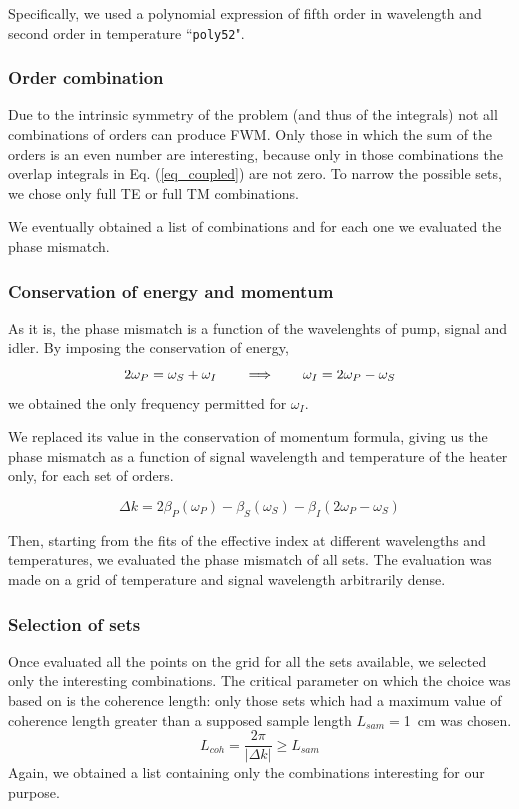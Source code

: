 \documentclass[12pt,a4paper,twoside]{article}
\begin{document}
Specifically, we used a polynomial expression of fifth order in wavelength and second order in temperature ``\texttt{poly52}".

\subsubsection{Order combination}

Due to the intrinsic symmetry of the problem (and thus of the integrals) not all combinations of orders can produce FWM.
Only those in which the sum of the orders is an even number are interesting, because only in those combinations the overlap integrals in Eq. (\ref{eq_coupled}) are not zero.
To narrow the possible sets, we chose only full TE or full TM  combinations.

We eventually obtained a list of combinations and for each one we evaluated the phase mismatch.

\subsubsection{Conservation of energy and momentum}
As it is, the phase mismatch is a function of the wavelenghts of pump, signal and idler.
By imposing the conservation of energy,
\begin{equation}
2\omega_P = \omega_S + \omega_I
\qquad \Longrightarrow \qquad
\omega_I = 2\omega_P - \omega_S \\
\end{equation}
we obtained the only frequency permitted for $\omega_I$.

We replaced its value in the conservation of momentum formula, giving us the phase mismatch as a function of signal wavelength and temperature of the heater only, for each set of orders.

\begin{equation}
	\Delta k = 2\beta_P(\omega_P)-\beta_S(\omega_S)-\beta_I(2\omega_P-\omega_S)
\end{equation}

Then, starting from the fits of the effective index at different wavelengths and temperatures, we evaluated the phase mismatch of all sets.
The evaluation was made on a grid of temperature and signal wavelength arbitrarily dense.

\subsubsection{Selection of sets}
Once evaluated all the points on the grid for all the sets available, we selected only the interesting combinations.
The critical parameter on which the choice was based on is the coherence length: only those sets which had a maximum value of coherence length greater than a supposed sample length $L_{sam} = $\SI{1}{\cm} was chosen.
\begin{equation}
	L_{coh} = \frac{2\pi}{|\Delta k|} \geq L_{sam}
	\label{eq_lcoh_crit}
\end{equation}
Again, we obtained a list containing only the combinations interesting for our purpose.
\end{document}
